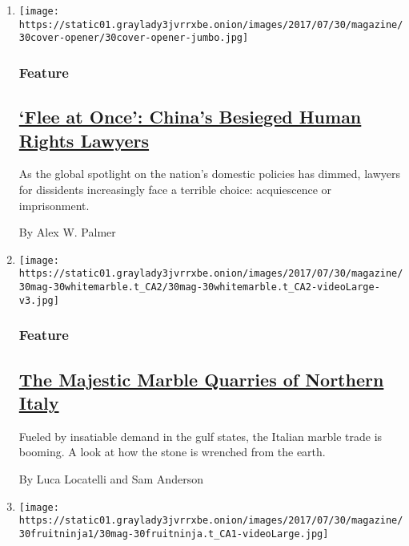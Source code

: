 \begin{enumerate}
\def\labelenumi{\arabic{enumi}.}
\item
  \texttt{[image: https://static01.graylady3jvrrxbe.onion/images/2017/07/30/magazine/30cover-opener/30cover-opener-jumbo.jpg]}

  \hypertarget{feature}{%
  \subsubsection{Feature}\label{feature}}

  \hypertarget{flee-at-once-chinas-besieged-human-rights-lawyers}{%
  \subsection{\texorpdfstring{\href{/2017/07/25/magazine/the-lonely-crusade-of-chinas-human-rights-lawyers.html}{`Flee
  at Once': China's Besieged Human Rights
  Lawyers}}{`Flee at Once': China's Besieged Human Rights Lawyers}}\label{flee-at-once-chinas-besieged-human-rights-lawyers}}

  As the global spotlight on the nation's domestic policies has dimmed,
  lawyers for dissidents increasingly face a terrible choice:
  acquiescence or imprisonment.

  By Alex W. Palmer
\item
  \texttt{[image: https://static01.graylady3jvrrxbe.onion/images/2017/07/30/magazine/30mag-30whitemarble.t\_CA2/30mag-30whitemarble.t\_CA2-videoLarge-v3.jpg]}

  \hypertarget{feature-1}{%
  \subsubsection{Feature}\label{feature-1}}

  \hypertarget{the-majestic-marble-quarries-of-northern-italy}{%
  \subsection{\texorpdfstring{\href{/2017/07/26/magazine/the-majestic-marble-quarries-of-northern-italy.html}{The
  Majestic Marble Quarries of Northern
  Italy}}{The Majestic Marble Quarries of Northern Italy}}\label{the-majestic-marble-quarries-of-northern-italy}}

  Fueled by insatiable demand in the gulf states, the Italian marble
  trade is booming. A look at how the stone is wrenched from the earth.

  By Luca Locatelli and Sam Anderson
\item
  \texttt{[image: https://static01.graylady3jvrrxbe.onion/images/2017/07/30/magazine/30fruitninja1/30mag-30fruitninja.t\_CA1-videoLarge.jpg]}


\end{enumerate}

